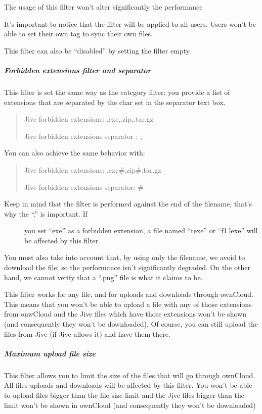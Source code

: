 \documentclass[letterpaper,10pt,english]{sphinxmanual}
\begin{document}
The usage of this filter won't alter significantly the performance

It's important to notice that the filter will be applied to all users. Users won't be able to set their own tag to sync their own files.

This filter can also be “disabled” by setting the filter empty.


\subparagraph{Forbidden extensions filter and separator}
\label{enterprise_external_storage/jive_configuration:forbidden-extensions-filter-and-separator}
This filter is set the same way as the category filter: you provide a list of extensions that are separated
by the char set in the separator text box.
\begin{quote}

Jive forbidden extensions: .exe,.zip,.tar.gz

Jive forbidden extensions separator : ,
\end{quote}

You can also achieve the same behavior with:
\begin{quote}

Jive forbidden extensions: .exe\#.zip\#.tar.gz

Jive forbidden extensions separator: \#
\end{quote}
\begin{description}
\item[{Keep in mind that the filter is performed against the end of the filename, that's why the “.” is important. If}] \leavevmode
you set “exe” as a forbidden extension, a file named “texe” or “f1.lexe” will be affected by this filter.

\end{description}

You must also take into account that, by using only the filename, we avoid to download the file, so the
performance isn't significantly degraded.
On the other hand, we cannot verify that a “.png” file is what it claims to be.

This filter works for any file, and for uploads and downloads through ownCloud. This means that you won't be able to
upload a file with any of those extensions from onwCloud and the Jive files which have those extensions won't
be shown (and consequently they won't be downloaded). Of course, you can still upload the files from Jive
(if Jive allows it) and have them there.


\subparagraph{Maximum upload file size}
\label{enterprise_external_storage/jive_configuration:maximum-upload-file-size}
This filter allows you to limit the size of the files that will go through ownCloud. All files uploads and
downloads will be affected by this filter. You won't be able to upload files bigger than the file size limit
and the Jive files bigger than the limit won't be shown in ownCloud (and consequently they won't be downloaded)
\end{document}
